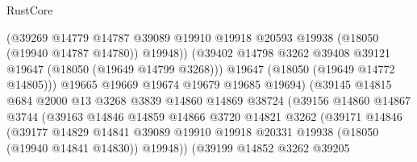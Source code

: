 \begin{lexlean}{RustCore}
\begin{coremodule}
                                  (@39269
                                    @14779
                                    @14787
                                    @39089
                                    @19910
                                    @19918
                                    @20593
                                    @19938
                                    (@18050 (@19940 @14787 @14780))
                                    @19948))
                                (@39402
                                  @14798
                                  @3262
                                  @39408
                                  @39121
                                  @19647
                                  (@18050 (@19649 @14799 @3268)))
                                @19647
                                (@18050 (@19649 @14772 @14805)))
                              @19665
                              @19669
                              @19674
                              @19679
                              @19685
                              @19694)
                            (@39145
                              @14815
                              @684
                              @2000
                              @13
                              @3268
                              @3839
                              @14860
                              @14869
                              @38724
                              (@39156
                                @14860
                                @14867
                                @3744
                                (@39163
                                  @14846
                                  @14859
                                  @14866
                                  @3720
                                  @14821
                                  @3262
                                  (@39171
                                    @14846
                                    (@39177
                                      @14829
                                      @14841
                                      @39089
                                      @19910
                                      @19918
                                      @20331
                                      @19938
                                      (@18050 (@19940 @14841 @14830))
                                      @19948))
                                  (@39199
                                    @14852
                                    @3262
                                    @39205

\end{coremodule}
\end{lexlean}
